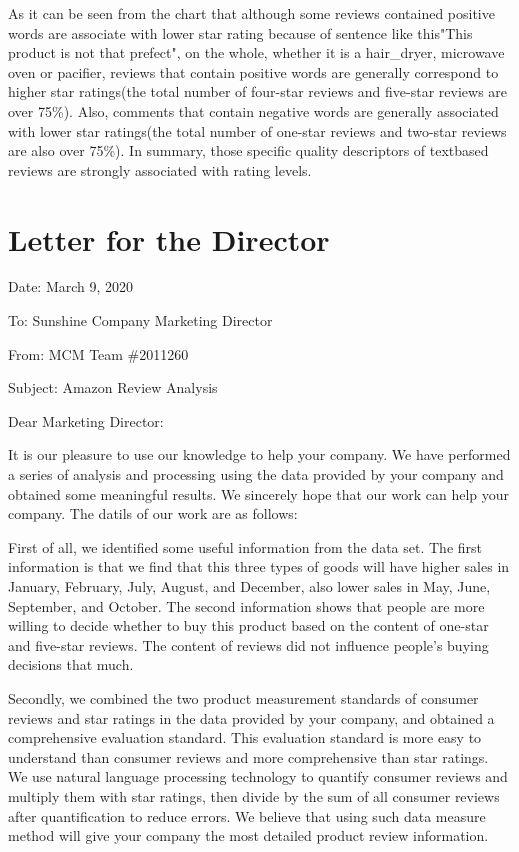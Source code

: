 \documentclass[12pt]{mcmthesis}
\begin{document}
\newpage
As it can be seen from the chart that although some reviews contained positive words are associate with lower star rating because of sentence like this"This product is not that prefect", on the whole, whether it is a hair\_dryer, microwave oven or pacifier, reviews that contain positive words are generally correspond to higher star ratings(the total number of four-star reviews and five-star reviews are over 75\%). Also, comments that contain negative words are generally associated with lower star ratings(the total number of one-star reviews and two-star reviews are also over 75\%). In summary, those specific quality descriptors of text\-based reviews are strongly associated with rating levels.



\newpage
\section{Letter for the Director}
\noindent Date: March 9, 2020

\noindent To: Sunshine Company Marketing Director

\noindent From: MCM Team \#2011260

\noindent Subject: Amazon Review Analysis

\noindent \hrulefill

\noindent Dear Marketing Director:

It is our pleasure to use our knowledge to help your company. We have performed a series of analysis and processing using the data provided by your company and obtained some meaningful results. We sincerely hope that our work can help your company. The datils of our work are as follows:

First of all, we identified some useful information from the data set. The first information is that we find that this three types of goods will have higher sales in January, February, July, August, and December, also lower sales in May, June, September, and October. The second information shows that people are more willing to decide whether to buy this product based on the content of one-star and five-star reviews. The content of reviews did not influence people's buying decisions that much.

Secondly, we combined the two product measurement standards of consumer reviews and star ratings in the data provided by your company, and obtained a comprehensive evaluation standard. This evaluation standard is more easy to understand than consumer reviews and more comprehensive than star ratings. We use natural language processing technology to quantify consumer reviews and multiply them with star ratings, then divide by the sum of all consumer reviews after quantification to reduce errors. We believe that using such data measure method will give your company the most detailed product review information.
\end{document}
